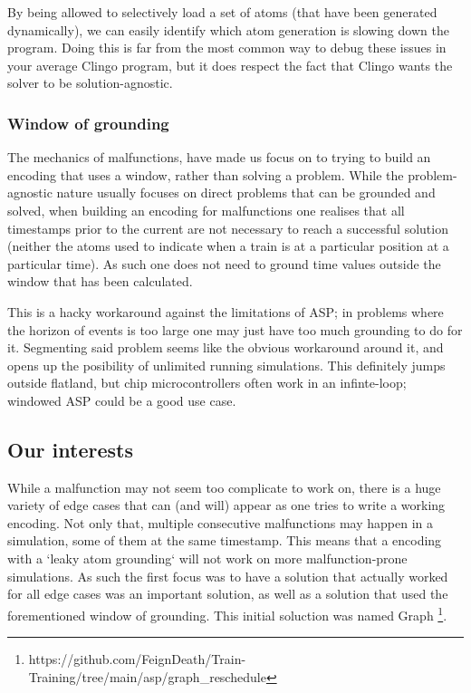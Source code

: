 By being allowed to selectively load a set of atoms (that have been generated dynamically), we can easily identify which atom generation is slowing down the program. Doing this is far from the most common way to debug these issues in your average Clingo program, but it does respect the fact that Clingo wants the solver to be solution-agnostic. 


\subsubsection{Window of grounding}
\label{sec:window}

The mechanics of malfunctions, have made us focus on to trying to build an encoding that uses a window, rather than solving a problem. While the problem-agnostic nature usually focuses on direct problems that can be grounded and solved, when building an encoding for malfunctions one realises that all timestamps prior to the current are not necessary to reach a successful solution (neither the atoms used to indicate when a train is at a particular position at a particular time). As such one does not need to ground time values outside the window that has been calculated.

This is a hacky workaround against the limitations of ASP; in problems where the horizon of events is too large one may just have too much grounding to do for it. Segmenting said problem seems like the obvious workaround around it, and opens up the posibility of unlimited running simulations. This definitely jumps outside flatland, but chip microcontrollers often work in an infinte-loop; windowed ASP could be a good use case.
  
 


\subsection{Our interests}

While a malfunction may not seem too complicate to work on, there is a huge variety of edge cases that can (and will) appear as one tries to write a working encoding. Not only that, multiple consecutive malfunctions may happen in a simulation, some of them at the same timestamp. This means that a encoding with a `leaky atom grounding` will not work on more malfunction-prone simulations. As such the first focus was to have a solution that actually worked for all edge cases was an important solution, as well as a solution that used the forementioned window of grounding. This initial soluction was named Graph \footnote{https://github.com/FeignDeath/Train-Training/tree/main/asp/graph\_reschedule}. 


